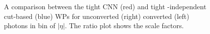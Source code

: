 \begin{figure}[htbp]
    \centering
	\begin{tcolorbox}[colback=black!5!white,colframe=white!75!black]
    \caption{A comparison between the tight CNN (red) and tight \eT-independent cut-based (blue) WPs for unconverted (right) converted (left) photons in bin of $|\eta|$. The ratio plot shows the scale factors.}
    \label{Eff:Tight:Inc}
    \end{tcolorbox}
    
\end{figure}

